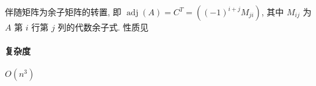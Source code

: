 伴随矩阵为余子矩阵的转置, 即 \(\operatorname{adj}(A)=C^T=\left((-1)^{i+j}M_{ji}\right)\), 其中 \(M_{ij}\) 为 \(A\) 第 \(i\) 行第 \(j\) 列的代数余子式. 性质见 

\paragraph{复杂度} \(O(n^3)\)